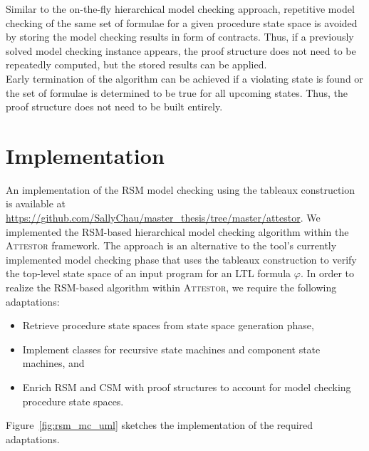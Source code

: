 \documentclass[a4paper, 12pt, twoside]{report}
\begin{document}
	Similar to the on-the-fly hierarchical model checking approach, repetitive model checking of the same set of formulae for a given procedure state space is avoided by storing the model checking results in form of contracts. Thus, if a previously solved model checking instance appears, the proof structure does not need to be repeatedly computed, but the stored results can be applied.\\
	
	Early termination of the algorithm can be achieved if a violating state is found or the set of formulae is determined to be true for all upcoming states. Thus, the proof structure does not need to be built entirely.
	
	\section{Implementation}
	
	An implementation of the RSM model checking using the tableaux construction is available at \url{https://github.com/SallyChau/master_thesis/tree/master/attestor}. We implemented the RSM-based hierarchical model checking algorithm within the \textsc{Attestor} framework. The approach is an alternative to the tool's currently implemented model checking phase that uses the tableaux construction to verify the top-level state space of an input program for an LTL formula $\varphi$. In order to realize the RSM-based algorithm within \textsc{Attestor}, we require the following adaptations:
	\begin{itemize}
		\item Retrieve procedure state spaces from state space generation phase,
		\item Implement classes for recursive state machines and component state machines, and
		\item Enrich RSM and CSM with proof structures to account for model checking procedure state spaces.
	\end{itemize}	
	
	Figure~\ref{fig:rsm_mc_uml} sketches the implementation of the required adaptations.\\
\end{document}
